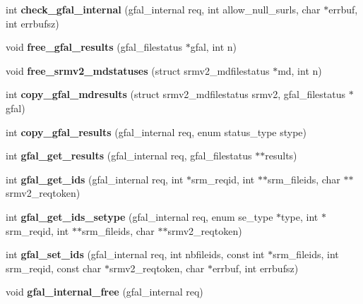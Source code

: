 \begin{CompactItemize}
\item 
int \textbf{check\_\-gfal\_\-internal} (gfal\_\-internal req, int allow\_\-null\_\-surls, char $\ast$errbuf, int errbufsz)\label{gfal__common_8c_9c2077bbb3673cb6a5d17bc5cec81342}

\item 
void \textbf{free\_\-gfal\_\-results} (gfal\_\-filestatus $\ast$gfal, int n)\label{gfal__common_8c_9567fdc300b34b1274cc43fef14b5f90}

\item 
void \textbf{free\_\-srmv2\_\-mdstatuses} (struct srmv2\_\-mdfilestatus $\ast$md, int n)\label{gfal__common_8c_7db5dc9eefae3a89e01fb3789e608000}

\item 
int \textbf{copy\_\-gfal\_\-mdresults} (struct srmv2\_\-mdfilestatus srmv2, gfal\_\-filestatus $\ast$gfal)\label{gfal__common_8c_bd3c2238eb91ebb15768a8699c6b885e}

\item 
int \textbf{copy\_\-gfal\_\-results} (gfal\_\-internal req, enum status\_\-type stype)\label{gfal__common_8c_54cf4105c597d35309f3208929bace40}

\item 
int \textbf{gfal\_\-get\_\-results} (gfal\_\-internal req, gfal\_\-filestatus $\ast$$\ast$results)\label{gfal__common_8c_bcdd56bd6e5b5c86b436fab3a02fbd8b}

\item 
int \textbf{gfal\_\-get\_\-ids} (gfal\_\-internal req, int $\ast$srm\_\-reqid, int $\ast$$\ast$srm\_\-fileids, char $\ast$$\ast$srmv2\_\-reqtoken)\label{gfal__common_8c_40c4088ef63981a3878a55a050ae6328}

\item 
int \textbf{gfal\_\-get\_\-ids\_\-setype} (gfal\_\-internal req, enum se\_\-type $\ast$type, int $\ast$srm\_\-reqid, int $\ast$$\ast$srm\_\-fileids, char $\ast$$\ast$srmv2\_\-reqtoken)\label{gfal__common_8c_a60d676ab5378d44d133a772aee07fb0}

\item 
int \textbf{gfal\_\-set\_\-ids} (gfal\_\-internal req, int nbfileids, const int $\ast$srm\_\-fileids, int srm\_\-reqid, const char $\ast$srmv2\_\-reqtoken, char $\ast$errbuf, int errbufsz)\label{gfal__common_8c_54d854da5f0c755a6b43e81b723dde98}

\item 
void \textbf{gfal\_\-internal\_\-free} (gfal\_\-internal req)\label{gfal__common_8c_73cd999ee9b3b89a7902c24d89ed8113}


\end{CompactItemize}
